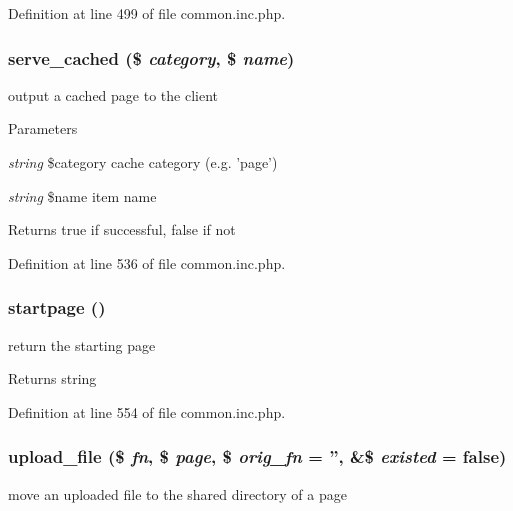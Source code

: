 Definition at line 499 of file common.inc.php.

\hypertarget{common_8inc_8php_aac90387dcab722e243df2d083f8d6a00}{
\subsubsection[{serve\_\-cached}]{\setlength{\rightskip}{0pt plus 5cm}serve\_\-cached (\$ {\em category}, \/  \$ {\em name})}}
\label{common_8inc_8php_aac90387dcab722e243df2d083f8d6a00}
output a cached page to the client


\begin{DoxyParams}{Parameters}
\item[{\em string}]\$category cache category (e.g. 'page') \item[{\em string}]\$name item name \end{DoxyParams}
\begin{DoxyReturn}{Returns}
true if successful, false if not 
\end{DoxyReturn}


Definition at line 536 of file common.inc.php.

\hypertarget{common_8inc_8php_a0a3ee1e9beca572266648f17b9c4c75f}{
\subsubsection[{startpage}]{\setlength{\rightskip}{0pt plus 5cm}startpage ()}}
\label{common_8inc_8php_a0a3ee1e9beca572266648f17b9c4c75f}
return the starting page

\begin{DoxyReturn}{Returns}
string 
\end{DoxyReturn}


Definition at line 554 of file common.inc.php.

\hypertarget{common_8inc_8php_a4659077c34b709eec75f9897ea07e55a}{
\subsubsection[{upload\_\-file}]{\setlength{\rightskip}{0pt plus 5cm}upload\_\-file (\$ {\em fn}, \/  \$ {\em page}, \/  \$ {\em orig\_\-fn} = {\ttfamily ''}, \/  \&\$ {\em existed} = {\ttfamily false})}}
\label{common_8inc_8php_a4659077c34b709eec75f9897ea07e55a}
move an uploaded file to the shared directory of a page


